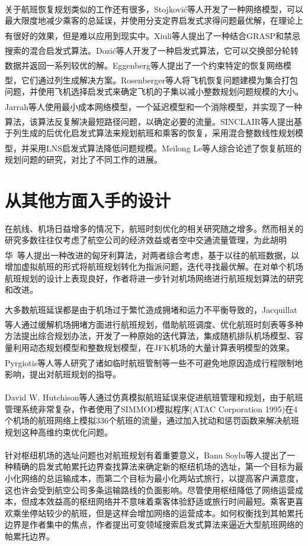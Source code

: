 \documentclass[runningheads]{llncs}
\newcommand{\upcite}[1]{\textsuperscript{\textsuperscript{\cite{#1}}}}
\begin{document}
关于航班恢复规划类似的工作还有很多，Stojković等人\upcite{ref_article26}开发了一种网络模型，可以最大限度地减少乘客的总延误，并使用分支定界启发式求得问题最优解，在理论上有很好的效果，但是难以应用到现实中。Xiuli等人\upcite{ref_article27}提出了一种结合GRASP和禁忌搜索的混合启发式算法。Dozić等人\upcite{ref_article28}开发了一种启发式算法，它可以交换部分轮转数据并返回一系列较优的解。Eggenberg等人\upcite{ref_article29}提出了一个约束特定的恢复网络模型，它们通过列生成解决方案。Rosenberger等人\upcite{ref_article30}将飞机恢复问题建模为集合打包问题，并使用飞机选择启发式来确定飞机的子集以减小整数规划问题规模的大小。Jarrah等人\upcite{ref_article31}使用最小成本网络模型，一个延迟模型和一个消除模型，并实现了一种算法，该算法反复解决最短路径问题，以确定必要的流量。SINCLAIR等人\upcite{ref_article4}提出基于列生成的后优化启发式算法来规划航班和乘客的恢复，采用混合整数线性规划模型，并采用LNS启发式算法降低问题规模。Meilong Le等人\upcite{ref_article8}综合论述了恢复航班的规划问题的研究，对比了不同工作的进展。

\section{从其他方面入手的设计}
在航线、机场日益增多的情况下，航班时刻优化的相关研究随之增多。然而相关的研究多数往往仅考虑了航空公司的经济效益或者空中交通流量管理，为此胡明华\ 等人提出一种改进的匈牙利算法\upcite{ref_article1}，对两者综合考虑，基于以往的航班数据，以增加虚拟航班的形式将航班规划转化为指派问题，迭代寻找最优解。在对单个机场航班规划的设计上表现良好，作者将进一步针对机场网络进行航班规划算法的研究和改进。

大多数航班延误都是由于机场过于繁忙造成拥堵和运力不平衡导致的，Jacquillat等人\upcite{ref_article6}通过缓解机场拥堵方面进行航班规划，借助航班调度、优化航班时刻表等多种方法提出综合规划办法，开发了一种原始的迭代算法，集成随机排队机场模型、容量利用动态规划模型和整数规划模型，在JFK机场的大量计算表明模型的效果。Pyrgiotis等人\upcite{ref_article7}等人研究了诸如临时航班管制等一些不可避免地原因造成行程限制地影响，提出对航班规划的指导。

David W. Hutchison等人\upcite{ref_article17}通过仿真模拟航班延误来促进航班管理和规划，由于航班管理系统非常复杂，作者使用了SIMMOD模拟程序(ATAC Corporation 1995)在4个机场的航班网络上模拟336个航班的流量，通过加入扰动和惩罚函数来解决航班规划这种高维约束优化问题。

针对枢纽机场的选址问题也对航班规划有着重要意义，Banu Soylu等人\upcite{ref_article18}提出了一种精确的启发式帕累托边界查找算法来确定新的枢纽机场的选址，第一个目标为最小化网络的总运输成本，而第二个目标为最小化两站式旅行，以提高客户满意度，这也许会受到航空公司多条运输路线的负面影响。尽管使用枢纽降低了网络运营成本，但成本效益高的枢纽网络并不意味着乘客体验舒适或旅行时间最短。乘客更喜欢乘坐停站较少的航班，但是这样会增加网络的运营成本。如何权衡找到其帕累托边界是作者集中的焦点，作者提出可变领域搜索启发式算法来逼近大型航班网络的帕累托边界。
\end{document}

